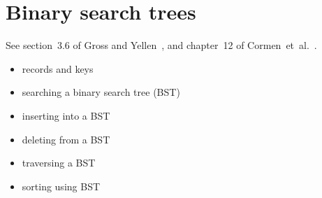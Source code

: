 
\section{Binary search trees}

See section~3.6 of Gross and Yellen~\cite{GrossYellen1999}, and
chapter~12 of Cormen~et~al.~\cite{CormenEtAl2001}.

\begin{itemize}
\item records and keys

\item searching a binary search tree (BST)

\item inserting into a BST

\item deleting from a BST

\item traversing a BST

\item sorting using BST
\end{itemize}
